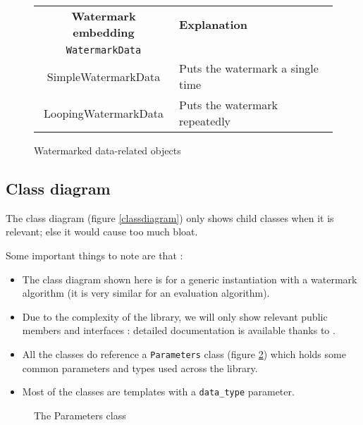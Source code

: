 \begin{figure}[h!]
\centering
\begin{tabular}{|c|l|}
\hline
\textbf{Watermark embedding} & \textbf{Explanation} \\
\texttt{WatermarkData} & \\
\hline
SimpleWatermarkData & Puts the watermark a single time \\   
LoopingWatermarkData & Puts the watermark repeatedly \\
\hline
\end{tabular}
\caption{Watermarked data-related objects}
\label{frameworkclass4}
\end{figure}

\newpage

\subsection{Class diagram}

The class diagram (figure \ref{classdiagram}) only shows child classes when it is relevant; else it would cause too much bloat.

Some important things to note are that :
\begin{itemize}
\item The class diagram shown here is for a generic instantiation with a watermark algorithm (it is very similar for an evaluation algorithm). 
\item Due to the complexity of the library, we will only show relevant public members and interfaces : detailed documentation is available thanks to .
\item All the classes do reference a \texttt{Parameters} class (figure \ref{parametersclass}) which holds some common parameters and types used across the library.
\item Most of the classes are templates with a \texttt{data\_type} parameter.
\end{itemize}


\begin{figure}[h!]
\centering
{}

\caption{The Parameters class}
\label{parametersclass}
\end{figure}


